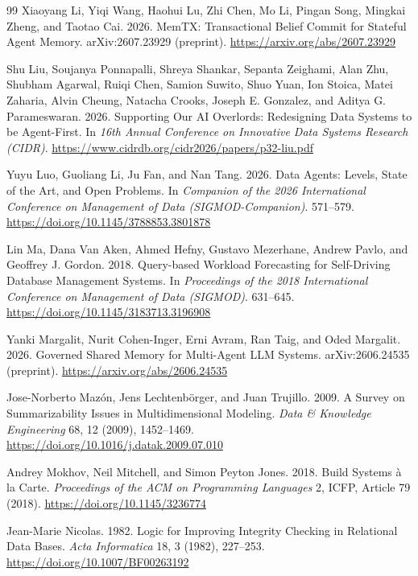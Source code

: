 \begin{thebibliography}{99}
Xiaoyang Li, Yiqi Wang, Haohui Lu, Zhi Chen, Mo Li, Pingan Song, Mingkai Zheng, and Taotao Cai. 2026. MemTX: Transactional Belief Commit for Stateful Agent Memory. arXiv:2607.23929 (preprint). \url{https://arxiv.org/abs/2607.23929}

Shu Liu, Soujanya Ponnapalli, Shreya Shankar, Sepanta Zeighami, Alan Zhu, Shubham Agarwal, Ruiqi Chen, Samion Suwito, Shuo Yuan, Ion Stoica, Matei Zaharia, Alvin Cheung, Natacha Crooks, Joseph E. Gonzalez, and Aditya G. Parameswaran. 2026. Supporting Our AI Overlords: Redesigning Data Systems to be Agent-First. In \emph{16th Annual Conference on Innovative Data Systems Research (CIDR)}. \url{https://www.cidrdb.org/cidr2026/papers/p32-liu.pdf}

Yuyu Luo, Guoliang Li, Ju Fan, and Nan Tang. 2026. Data Agents: Levels, State of the Art, and Open Problems. In \emph{Companion of the 2026 International Conference on Management of Data (SIGMOD-Companion)}. 571--579. \url{https://doi.org/10.1145/3788853.3801878}

Lin Ma, Dana Van Aken, Ahmed Hefny, Gustavo Mezerhane, Andrew Pavlo, and Geoffrey J. Gordon. 2018. Query-based Workload Forecasting for Self-Driving Database Management Systems. In \emph{Proceedings of the 2018 International Conference on Management of Data (SIGMOD)}. 631--645. \url{https://doi.org/10.1145/3183713.3196908}

Yanki Margalit, Nurit Cohen-Inger, Erni Avram, Ran Taig, and Oded Margalit. 2026. Governed Shared Memory for Multi-Agent LLM Systems. arXiv:2606.24535 (preprint). \url{https://arxiv.org/abs/2606.24535}

Jose-Norberto Maz{\'o}n, Jens Lechtenb{\"o}rger, and Juan Trujillo. 2009. A Survey on Summarizability Issues in Multidimensional Modeling. \emph{Data \& Knowledge Engineering} 68, 12 (2009), 1452--1469. \url{https://doi.org/10.1016/j.datak.2009.07.010}

Andrey Mokhov, Neil Mitchell, and Simon Peyton Jones. 2018. Build Systems {\`a} la Carte. \emph{Proceedings of the ACM on Programming Languages} 2, ICFP, Article 79 (2018). \url{https://doi.org/10.1145/3236774}

Jean-Marie Nicolas. 1982. Logic for Improving Integrity Checking in Relational Data Bases. \emph{Acta Informatica} 18, 3 (1982), 227--253. \url{https://doi.org/10.1007/BF00263192}


\end{thebibliography}
